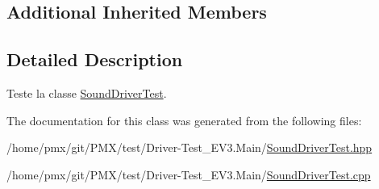 \subsection*{Additional Inherited Members}


\subsection{Detailed Description}
Teste la classe \hyperlink{classtest_1_1SoundDriverTest}{Sound\+Driver\+Test}. 

The documentation for this class was generated from the following files\+:\begin{DoxyCompactItemize}
\item 
/home/pmx/git/\+P\+M\+X/test/\+Driver-\/\+Test\+\_\+\+E\+V3.\+Main/\hyperlink{SoundDriverTest_8hpp}{Sound\+Driver\+Test.\+hpp}\item 
/home/pmx/git/\+P\+M\+X/test/\+Driver-\/\+Test\+\_\+\+E\+V3.\+Main/\hyperlink{SoundDriverTest_8cpp}{Sound\+Driver\+Test.\+cpp}\end{DoxyCompactItemize}
